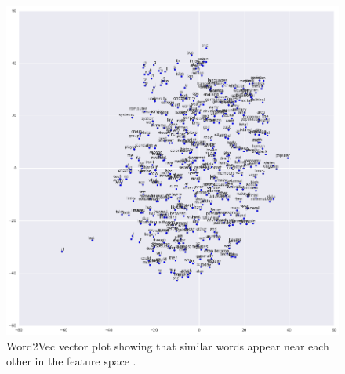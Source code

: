 \documentclass[12pt]{article}
\begin{document}
\begin{figure}[htbp!]\centering
	\centering
	\includegraphics[scale=.5]{tsne.png}
	\caption{Word2Vec vector plot showing that similar words appear near each other in the feature space \cite{tensorflow}.}
\end{figure}

\newpage


\end{document}
